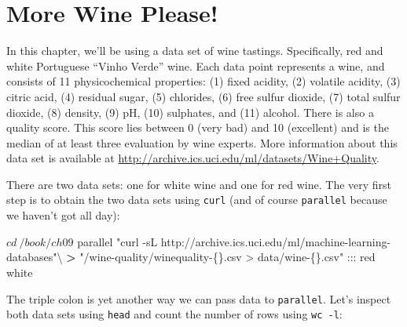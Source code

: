 \documentclass[
]{book}
\newenvironment{Shaded}{\begin{snugshade}}{\end{snugshade}}
\newcommand{\BuiltInTok}[1]{#1}
\newcommand{\ExtensionTok}[1]{#1}
\newcommand{\NormalTok}[1]{#1}
\newcommand{\OperatorTok}[1]{\textcolor[rgb]{0.81,0.36,0.00}{\textbf{#1}}}
\newcommand{\StringTok}[1]{\textcolor[rgb]{0.31,0.60,0.02}{#1}}
\theoremstyle{definition}
\theoremstyle{definition}
\theoremstyle{definition}
\theoremstyle{remark}
\begin{document}
\hypertarget{more-wine-please}{%
\section{More Wine Please!}\label{more-wine-please}}

In this chapter, we'll be using a data set of wine tastings. Specifically, red and white Portuguese ``Vinho Verde'' wine. Each data point represents a wine, and consists of 11 physicochemical properties: (1) fixed acidity, (2) volatile acidity, (3) citric acid, (4) residual sugar, (5) chlorides, (6) free sulfur dioxide, (7) total sulfur dioxide, (8) density, (9) pH, (10) sulphates, and (11) alcohol. There is also a quality score. This score lies between 0 (very bad) and 10 (excellent) and is the median of at least three evaluation by wine experts. More information about this data set is available at \url{http://archive.ics.uci.edu/ml/datasets/Wine+Quality}.

There are two data sets: one for white wine and one for red wine. The very first step is to obtain the two data sets using \texttt{curl} (and of course \texttt{parallel} because we haven't got all day):

\begin{Shaded}
\begin{Highlighting}[]
\NormalTok{$ }\BuiltInTok{cd}\NormalTok{ ~/book/ch09}
\NormalTok{$ }\ExtensionTok{parallel} \StringTok{"curl -sL http://archive.ics.uci.edu/ml/machine-learning-databases"}\NormalTok{\textbackslash{}}
\OperatorTok{>} \StringTok{"/wine-quality/winequality-\{\}.csv > data/wine-\{\}.csv"}\NormalTok{ ::: red white}
\end{Highlighting}
\end{Shaded}

The triple colon is yet another way we can pass data to \texttt{parallel}. Let's inspect both data sets using \texttt{head} and count the number of rows using \texttt{wc\ -l}:
\end{document}
